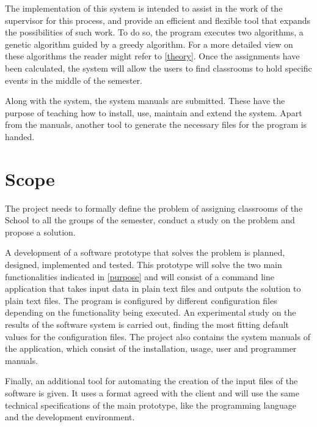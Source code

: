 The implementation of this system is intended to assist in the work of the supervisor for this process, and provide an efficient and flexible tool that expands the possibilities of such work. To do so, the program executes two algorithms, a genetic algorithm guided by a greedy algorithm. For a more detailed view on these algorithms the reader might refer to \ref{theory}. Once the assignments have been calculated, the system will allow the users to find classrooms to hold specific events in the middle of the semester.

Along with the system, the system manuals are submitted. These have the purpose of teaching how to install, use, maintain and extend the system. Apart from the manuals, another tool to generate the necessary files for the program is handed.


\section{Scope}

The project needs to formally define the problem of assigning classrooms of the School to all the groups of the semester, conduct a study on the problem and propose a solution. 

A development of a software prototype that solves the problem is planned, designed, implemented and tested. This prototype will solve the two main functionalities indicated in \ref{purpose} and will consist of a command line application that takes input data in plain text files and outputs the solution to plain text files. The program is configured by different configuration files depending on the functionality being executed. An experimental study on the results of the software system is carried out, finding the most fitting default values for the configuration files. The project also contains the system manuals of the application, which consist of the installation, usage, user and programmer manuals. 

Finally, an additional tool for automating the creation of the input files of the software is given. It uses a format agreed with the client and will use the same technical specifications of the main prototype, like the programming language and the development environment.


